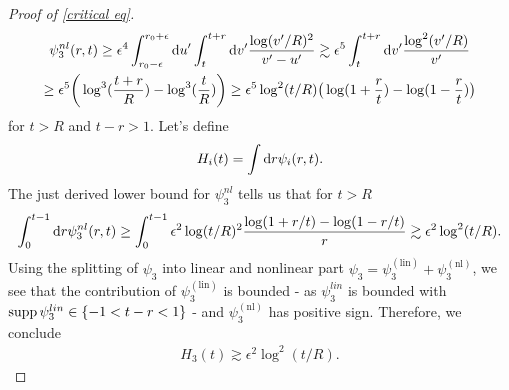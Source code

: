 \documentclass[11pt, oneside]{amsart}
\begin{document}
\begin{proof}[Proof of \cref{critical eq}]
		\begin{equation*}
			\begin{gathered}
				\psi_3^{nl}(r,t)\geq\epsilon^4 \int_{r_0-\epsilon}^{r_0+\epsilon}\mathrm{d} u'\int_t^{t+r}\mathrm{d} v' \frac{\log(v'/R)^2}{v'-u'}\gtrsim \epsilon^5 \int_t^{t+r} \mathrm{d} v'\frac{\log^2(v'/R)}{v'}\\
				\geq \epsilon^5\bigg(\log^3(\frac{t+r}{R})-\log^3(\frac{t}{R})\bigg)\geq\epsilon^5\log^2(t/R)\big(\log(1+\frac{r}{t})-\log(1-\frac{r}{t})\big)
			\end{gathered}
		\end{equation*}
		for $t>R$ and $t-r>1$. Let's define
		\begin{equation*}
			\begin{gathered}
				H_i(t)=\int\mathrm{d} r \psi_i(r,t).
			\end{gathered}
		\end{equation*}
	The just derived lower bound for $\psi_3^{nl}$ tells us that for $t>R$
	\begin{equation*}
		\begin{gathered}
			\int_0^{t-1} \mathrm{d} r \psi_3^{nl}(r,t)\geq \int_0^{t-1}\epsilon^2\log(t/R)^2\frac{\log(1+r/t)-\log(1-r/t)}{r}\gtrsim \epsilon^2\log^2(t/R).
		\end{gathered}
	\end{equation*}
	Using the splitting of $\psi_3$ into linear and nonlinear part $\psi_3=\psi_3^{(\text{lin})}+\psi_3^{(\text{nl})}$, we see that the contribution of $\psi_3^{(\text{lin})}$ is bounded - as $\psi_3^{lin}$ is bounded with $\operatorname{supp}\psi_3^{lin}\in\{-1<t-r<1\}$ -  and $\psi_3^{(\text{nl})}$ has positive sign. Therefore, we conclude 
	\begin{equation*}
		\begin{gathered}
			H_3(t)\gtrsim \epsilon^2\log^2(t/R).
		\end{gathered}
	\end{equation*}
	

\end{proof}
\end{document}
